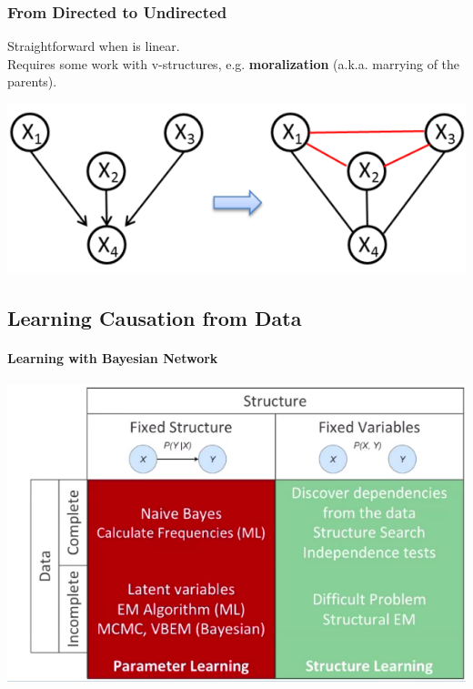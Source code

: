 \documentclass[10pt]{report}
\begin{document}
\subsubsection{From Directed to Undirected}
Straightforward when is linear.\\Requires some work with v-structures, e.g. \textbf{moralization} (a.k.a. marrying of the parents).\begin{center}
	\includegraphics[scale=0.5]{25.png}
\end{center}
\pagebreak
\subsection{Learning Causation from Data}
\paragraph{Learning with Bayesian Network}
\begin{center}
	\includegraphics[scale=0.33]{26.png}
\end{center}
\end{document}
